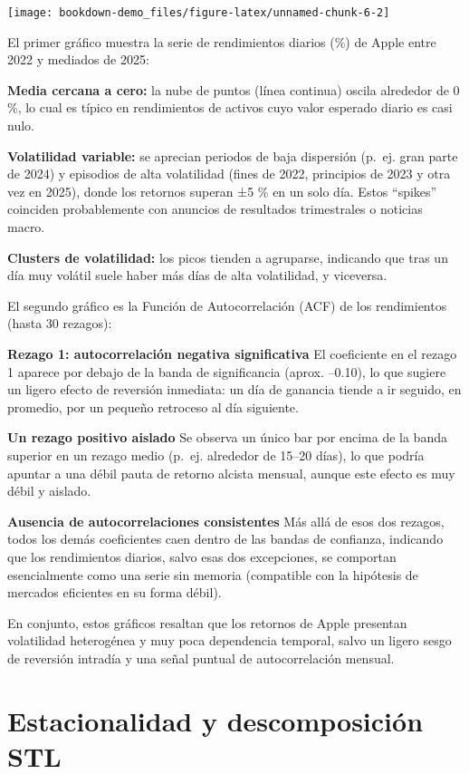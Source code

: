\documentclass[
  11pt,
]{book}
\begin{document}
\begin{center}\texttt{[image: bookdown-demo\_files/figure-latex/unnamed-chunk-6-2]} \end{center}

El primer gráfico muestra la serie de rendimientos diarios (\%) de Apple entre 2022 y mediados de 2025:

\textbf{Media cercana a cero:} la nube de puntos (línea continua) oscila alrededor de 0 \%, lo cual es típico en rendimientos de activos cuyo valor esperado diario es casi nulo.

\textbf{Volatilidad variable:} se aprecian periodos de baja dispersión (p.~ej. gran parte de 2024) y episodios de alta volatilidad (fines de 2022, principios de 2023 y otra vez en 2025), donde los retornos superan ±5 \% en un solo día. Estos ``spikes'' coinciden probablemente con anuncios de resultados trimestrales o noticias macro.

\textbf{Clusters de volatilidad:} los picos tienden a agruparse, indicando que tras un día muy volátil suele haber más días de alta volatilidad, y viceversa.

El segundo gráfico es la Función de Autocorrelación (ACF) de los rendimientos (hasta 30 rezagos):

\textbf{Rezago 1: autocorrelación negativa significativa}
El coeficiente en el rezago 1 aparece por debajo de la banda de significancia (aprox. --0.10), lo que sugiere un ligero efecto de reversión inmediata: un día de ganancia tiende a ir seguido, en promedio, por un pequeño retroceso al día siguiente.

\textbf{Un rezago positivo aislado}
Se observa un único bar por encima de la banda superior en un rezago medio (p.~ej. alrededor de 15--20 días), lo que podría apuntar a una débil pauta de retorno alcista mensual, aunque este efecto es muy débil y aislado.

\textbf{Ausencia de autocorrelaciones consistentes}
Más allá de esos dos rezagos, todos los demás coeficientes caen dentro de las bandas de confianza, indicando que los rendimientos diarios, salvo esas dos excepciones, se comportan esencialmente como una serie sin memoria (compatible con la hipótesis de mercados eficientes en su forma débil).

En conjunto, estos gráficos resaltan que los retornos de Apple presentan volatilidad heterogénea y muy poca dependencia temporal, salvo un ligero sesgo de reversión intradía y una señal puntual de autocorrelación mensual.

\section{Estacionalidad y descomposición STL}\label{estacionalidad-y-descomposiciuxf3n-stl}
\end{document}
